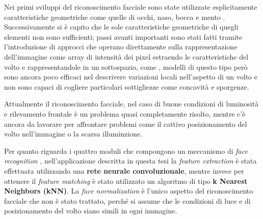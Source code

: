 Nei primi sviluppi del riconoscimento facciale sono state utilizzate esplicitamente caratteristiche geometriche come quelle di occhi, naso, bocca e mento \cite{kanade1974picture}. Successivamente si è capito che le sole caratteristiche geometriche di quegli elementi non sono sufficienti; passi avanti importanti sono stati fatti tramite l'introduzione di approcci che operano direttamente sulla rappresentazione dell'immagine come array di intensità dei pixel estraendo le caratteristiche del volto e rappresentandole in un sottospazio, come  \cite{turk1991eigenfaces}, modelli di questo tipo però sono ancora poco efficaci nel descrivere variazioni locali nell'aspetto di un volto e non sono capaci di cogliere particolari sottigliezze come concavità e sporgenze. 

Attualmente il riconoscimento facciale, nel caso di buone condizioni di luminosità e rilevamento frontale è un problema quasi completamente risolto, mentre c'è ancora da lavorare per affrontare problemi come il cattivo posizionamento del volto nell'immagine o la scarsa illuminzione.

Per quanto riguarda i quattro moduli che compongono un meccanismo di \textit{face recognition} , nell'applicazione descritta in questa tesi la \textit{feature extraction} è stata effettuata utilizzando una \textbf{rete neurale convoluzionale}, mentre invece per ottenere il \textit{feature matching} è stato utilizzato un algoritmo di tipo \textbf{k Nearest Neighbors (kNN)}. La \textit{face normalization} è l'unico aspetto del riconoscimento facciale che non è stato trattato, perché si assume che le condizioni di luce e di posizionamento del volto siano simili in ogni immagine.

